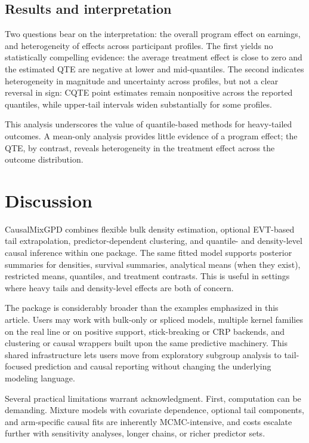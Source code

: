 \documentclass[preprint,12pt,authoryear]{elsarticle}
\newcommand{\pkg}[1]{\textsf{#1}}
\begin{document}
\subsection{Results and interpretation}

Two questions bear on the interpretation: the overall program effect on earnings, and heterogeneity of effects across participant profiles. The first yields no statistically compelling evidence: the average treatment effect is close to zero and the estimated QTE are negative at lower and mid-quantiles. The second indicates heterogeneity in magnitude and uncertainty across profiles, but not a clear reversal in sign: CQTE point estimates remain nonpositive across the reported quantiles, while upper-tail intervals widen substantially for some profiles.

This analysis underscores the value of quantile-based methods for heavy-tailed outcomes. A mean-only analysis provides little evidence of a program effect; the QTE, by contrast, reveals heterogeneity in the treatment effect across the outcome distribution.

\section{Discussion}
\label{sec:discussion}

\pkg{CausalMixGPD} combines flexible bulk density estimation,
optional EVT-based tail extrapolation, predictor-dependent clustering,
and quantile- and density-level causal inference within one package.
The same fitted model supports posterior summaries for densities,
survival summaries, analytical means (when they exist), restricted means,
quantiles, and treatment contrasts. This is useful in settings where
heavy tails and density-level effects are both of concern.

The package is considerably broader than the examples
emphasized in this article.  Users may work with bulk-only or spliced
models, multiple kernel families on the real line or on positive
support, stick-breaking or CRP backends, and clustering or causal
wrappers built upon the same predictive machinery.  This shared
infrastructure lets users move from exploratory subgroup analysis to
tail-focused prediction and causal reporting without changing the
underlying modeling language.

Several practical limitations warrant acknowledgment.  First,
computation can be demanding.  Mixture models with covariate
dependence, optional tail components, and arm-specific causal fits are
inherently MCMC-intensive, and costs escalate further with sensitivity
analyses, longer chains, or richer predictor sets.
\end{document}
